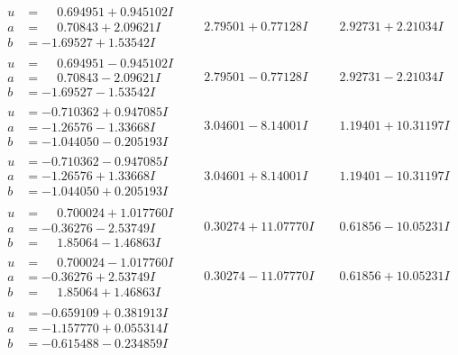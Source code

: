\documentclass[1p]{elsarticle_modified}
\theoremstyle{definition}
\begin{document}
$$\begin{array}{c|c|c}
\begin{aligned}
u &= \phantom{-}0.694951 + 0.945102 I \\
a &= \phantom{-}0.70843 + 2.09621 I \\
b &= -1.69527 + 1.53542 I\end{aligned}
 & \phantom{-}2.79501 + 0.77128 I & \phantom{-}2.92731 + 2.21034 I \\ \hline\begin{aligned}
u &= \phantom{-}0.694951 - 0.945102 I \\
a &= \phantom{-}0.70843 - 2.09621 I \\
b &= -1.69527 - 1.53542 I\end{aligned}
 & \phantom{-}2.79501 - 0.77128 I & \phantom{-}2.92731 - 2.21034 I \\ \hline\begin{aligned}
u &= -0.710362 + 0.947085 I \\
a &= -1.26576 - 1.33668 I \\
b &= -1.044050 - 0.205193 I\end{aligned}
 & \phantom{-}3.04601 - 8.14001 I & \phantom{-}1.19401 + 10.31197 I \\ \hline\begin{aligned}
u &= -0.710362 - 0.947085 I \\
a &= -1.26576 + 1.33668 I \\
b &= -1.044050 + 0.205193 I\end{aligned}
 & \phantom{-}3.04601 + 8.14001 I & \phantom{-}1.19401 - 10.31197 I \\ \hline\begin{aligned}
u &= \phantom{-}0.700024 + 1.017760 I \\
a &= -0.36276 - 2.53749 I \\
b &= \phantom{-}1.85064 - 1.46863 I\end{aligned}
 & \phantom{-}0.30274 + 11.07770 I & \phantom{-}0.61856 - 10.05231 I \\ \hline\begin{aligned}
u &= \phantom{-}0.700024 - 1.017760 I \\
a &= -0.36276 + 2.53749 I \\
b &= \phantom{-}1.85064 + 1.46863 I\end{aligned}
 & \phantom{-}0.30274 - 11.07770 I & \phantom{-}0.61856 + 10.05231 I \\ \hline\begin{aligned}
u &= -0.659109 + 0.381913 I \\
a &= -1.157770 + 0.055314 I \\
b &= -0.615488 - 0.234859 I\end{aligned}

\end{array}$$
\end{document}
